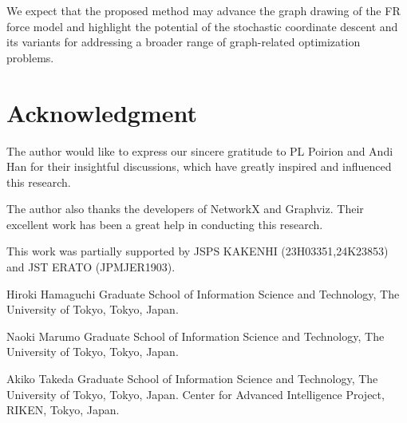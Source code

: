 \documentclass[dvipdfmx,10pt,journal,compsoc]{IEEEtran}
\begin{document}
We expect that the proposed method may advance the graph drawing of the FR force model and highlight the potential of the stochastic coordinate descent and its variants for addressing a broader range of graph-related optimization problems.

\section{Acknowledgment}

The author would like to express our sincere gratitude to PL Poirion and Andi Han for their insightful discussions, which have greatly inspired and influenced this research.

The author also thanks the developers of NetworkX and Graphviz. Their excellent work has been a great help in conducting this research.

This work was partially supported by JSPS KAKENHI (23H03351,24K23853) and JST ERATO (JPMJER1903).



\begin{IEEEbiographynophoto}{Hiroki Hamaguchi}
  Graduate School of Information Science and Technology, The University of Tokyo, Tokyo, Japan.
\end{IEEEbiographynophoto}
\begin{IEEEbiographynophoto}{Naoki Marumo}
  Graduate School of Information Science and Technology, The University of Tokyo, Tokyo, Japan.
\end{IEEEbiographynophoto}
\begin{IEEEbiographynophoto}{Akiko Takeda}
  Graduate School of Information Science and Technology, The University of Tokyo, Tokyo, Japan.
  Center for Advanced Intelligence Project, RIKEN, Tokyo, Japan.
\end{IEEEbiographynophoto}
\end{document}
